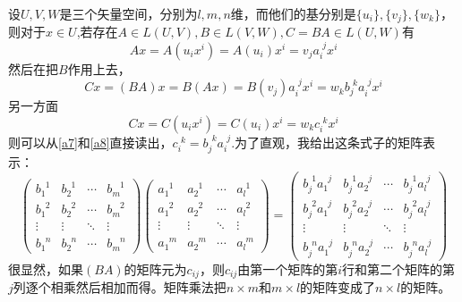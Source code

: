 \documentclass[11pt,a4paper,openany]{book}%
\theoremstyle{plain}%
\begin{document}
设$U,V,W$是三个矢量空间，分别为$l,m,n$维，而他们的基分别是$\{u_i\},\{v_j\},\{w_k\}$，则对于$x\in U$,若存在$A\in L(U,V),B\in L(V,W),C=BA\in L(U,W)$有
\[
Ax=A(u_{i}x^{i})=A(u_{i})x^{i}=v_{j}a_{i}^{\phantom{i}j}x^{i}
\]
然后在把$B$作用上去，
\begin{equation}
\label{a7}
Cx=(BA)x=B(Ax)=B(v_{j})a_{i}^{\phantom{i}j}x^{i}=w_k b^{\phantom{i}k}_ja_{i}^{\phantom{i}j}x^{i}
\end{equation}
另一方面
\begin{equation}
\label{a8}
Cx=C(u_{i}x^{i})=C(u_{i})x^{i}=w_{k}c_{i}^{\phantom{i}k}x^{i}
\end{equation}
则可以从\eqref{a7}和\eqref{a8}直接读出，$c_{i}^{\phantom{i}k}=b^{\phantom{j}k}_ja_{i}^{\phantom{i}j}$.为了直观，我给出这条式子的矩阵表示：\\
\begin{equation}
\label{a9}
\begin{pmatrix}
	b_{1}^{\phantom{1}1} & b_{2}^{\phantom{2}1} & \cdots & b_{m}^{\phantom{m}1}\\
	b_{1}^{\phantom{1}2} & b_{2}^{\phantom{2}2} & \cdots & b_{m}^{\phantom{m}2}\\
	\vdots & \vdots & \ddots & \vdots \\
	b_{1}^{\phantom{1}n} & b_{2}^{\phantom{2}n} & \cdots & b_{m}^{\phantom{m}n}
\end{pmatrix}
\begin{pmatrix}
	a_{1}^{\phantom{1}1} & a_{2}^{\phantom{2}1} & \cdots & a_{l}^{\phantom{l}1}\\
	a_{1}^{\phantom{1}2} & a_{2}^{\phantom{2}2} & \cdots & a_{l}^{\phantom{l}2}\\
	\vdots & \vdots & \ddots & \vdots \\
	a_{1}^{\phantom{1}m} & a_{2}^{\phantom{2}m} & \cdots & a_{l}^{\phantom{l}m}
\end{pmatrix}
=
\begin{pmatrix}
	b^{\phantom{j}1}_ja_{1}^{\phantom{1}j} & b^{\phantom{j}1}_ja_{2}^{\phantom{2}j} & \cdots & b^{\phantom{j}1}_ja_{l}^{\phantom{l}j}\\
	b^{\phantom{j}2}_ja_{1}^{\phantom{1}j} & b^{\phantom{j}2}_ja_{2}^{\phantom{2}j}& \cdots & b^{\phantom{j}2}_ja_{l}^{\phantom{l}j}\\
	\vdots & \vdots & \ddots & \vdots \\
	b^{\phantom{j}n}_ja_{1}^{\phantom{1}j} & b^{\phantom{j}n}_ja_{2}^{\phantom{2}j}& \cdots & b^{\phantom{j}n}_ja_{l}^{\phantom{l}j}
\end{pmatrix}
\end{equation}
很显然，如果$(BA)$的矩阵元为$c_{ij}$，则$c_{ij}$由第一个矩阵的第$i$行和第二个矩阵的第$j$列逐个相乘然后相加而得。矩阵乘法把$n\times m$和$m \times l$的矩阵变成了$n \times l$的矩阵。
\end{document}
